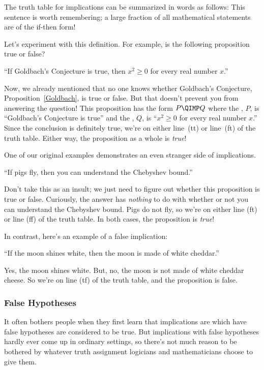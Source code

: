 The truth table for implications can be summarized in words as
follows:
This sentence is worth remembering; a large fraction of all
mathematical statements are of the if-then form!

Let's experiment with this definition.  For example, is the following
proposition true or false?
\begin{center}
``If Goldbach's Conjecture is true, then $x^2 \geq 0$ for every real
number $x$.''
\end{center}
Now, we already mentioned that no one knows whether Goldbach's Conjecture,
Proposition~\ref{Goldbach}, is true or false.  But that doesn't prevent
you from answering the question!  This proposition has the form $P
\QIMP Q$ where the , $P$, is ``Goldbach's Conjecture
is true'' and the , $Q$, is ``$x^2 \geq 0$ for every real
number $x$.''  Since the conclusion is definitely true, we're on either
line~(tt) or line~(ft) of the truth table.  Either way, the proposition as
a whole is \textit{true}!

One of our original examples demonstrates an even stranger side of
implications.
\begin{center}
``If pigs fly, then you can understand the Chebyshev bound.''
\end{center}
Don't take this as an insult; we just need to figure out whether this
proposition is true or false.  Curiously, the answer has \textit{nothing}
to do with whether or not you can understand the Chebyshev bound.  Pigs do
not fly, so we're on either line (ft) or line (ff) of the truth table.  In
both cases, the proposition is \textit{true}!

In contrast, here's an example of a false implication:
\begin{center}
``If the moon shines white, then the moon is made of white cheddar.''
\end{center}
Yes, the moon shines white.  But, no, the moon is not made of white
cheddar cheese.  So we're on line (tf) of the truth table, and the
proposition is false.

\subsubsection{False Hypotheses}

It often bothers people when they first learn that implications are
which have false hypotheses are considered to be true.  But
implications with false hypotheses hardly ever come up in ordinary
settings, so there's not much reason to be bothered by whatever truth
assignment logicians and mathematicians choose to give them.

